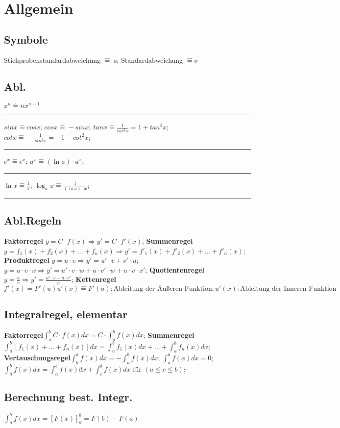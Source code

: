 \section{Allgemein}
\subsection{Symbole}
Stichprobenstandardabweichung $ \hat{=} $ s;
Standardabweichung $ \hat{=} \sigma $
\subsection{Abl.}
$ x^n  \hat{=} nx^{n-1}$
\hrule
$ sin x \hat{=} cos x $; 
$ cos x  \hat{=} - sin x $; 
$ tan x \hat{=} \frac{1}{cos^2 x} = 1 + tan^2 x $;
$ cot x \hat{=} - \frac{1}{sin^2 x} = - 1 -cot^2 x $; 
\hrule
$ e^x \hat{=} e^x $; 
$ a^x \hat{=} (\ln a) \cdot a^x $; 
\hrule
$ \ln x \hat{=} \frac{1}{x} $;
$ \log_a x  \hat{=} \frac{1}{(\ln a) \cdot x}$; 
\hrule
\subsection{Abl.Regeln}
\textbf{Faktorregel} $ y = C \cdot f(x) \Rightarrow  y' = C \cdot f'(x) $; 
\textbf{Summenregel} $ y = f_{1}(x) + f_{2}(x) + ... +f_{n}(x) \Rightarrow y' = f'_{1}(x) + f'_{2}(x) + ... + f'_{n}(x) $; 
\textbf{Produktregel} $ y = u \cdot v \Rightarrow y' = u'\cdot v + v' \cdot u $; 
$ y = u \cdot v \cdot x \Rightarrow y' = u' \cdot v \cdot w + u \cdot v' \cdot w + u \cdot v \cdot x'$; 
\textbf{Quotientenregel} $ y = \frac{u}{v} \Rightarrow y' = \frac{u' \cdot v - u \cdot v'}{v^2}$; 
\textbf{Kettenregel} $ f'(x) = F'(u) u'(x) \hat{=} F'(u): \text{Ableitung der Äußeren Funktion}; u'(x): \text{Ableitung der Inneren Funktion}$
\subsection{Integralregel, elementar}
\textbf{Faktorregel}$\int_{a}^{b}  C \cdot f(x) dx = C \cdot \int_{a}^{b} f(x)dx$; 
\textbf{Summenregel} $ \int_{a}^{b} [f_{1}(x) + ... + f_{n}(x)] dx = \int_{a}^{b} f_{1}(x) dx + ... + \int_{a}^{b}f_{n}(x) dx$; 
\textbf{Vertauschungsregel}$ \int_{b}^{a}f(x) dx = -\int_{a}^{b} f(x) dx$; 
$ \int_{a}^{a} f(x) dx = 0 $; 
$ \int_{a}^{b}f(x) dx = \int_{a}^{c} f(x) dx + \int_{c}^{b} f(x) dx  \text{ für } (a \le c \le b) $; 
\subsection{Berechnung best. Integr.}
$ \int_{a}^{b} f (x) dx = [F(x)]_{a}^{b} = F(b)- F(a) $
